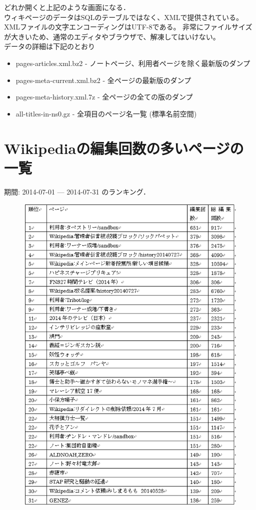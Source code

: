 どれか開くと上記のような画面になる．\\
ウィキページのデータはSQLのテーブルではなく、XMLで提供されている。XMLファイルの文字エンコーディングはUTF-8である。 非常にファイルサイズが大きいため、通常のエディタやブラウザで、解凍してはいけない。\\
データの詳細は下記のとおり

\begin{itemize}
 \item pages-articles.xml.bz2 - ノートページ、利用者ページを除く最新版のダンプ
 \item pages-meta-current.xml.bz2 - 全ページの最新版のダンプ
 \item pages-meta-history.xml.7z - 全ページの全ての版のダンプ
 \item all-titles-in-ns0.gz - 全項目のページ名一覧 (標準名前空間)
\end{itemize}


\clearpage


\section{Wikipediaの編集回数の多いページの一覧}

期間: 2014-07-01 — 2014-07-31 のランキング．


\begin{figure}[H]
\centering
\includegraphics[width=12cm]{sample6.png}

\end{figure}


